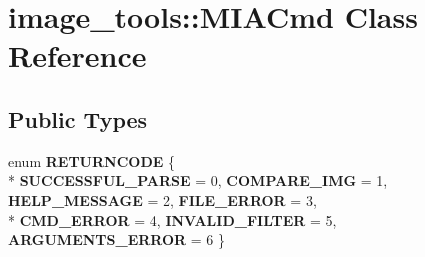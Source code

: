\hypertarget{classimage__tools_1_1MIACmd}{}\section{image\+\_\+tools\+:\+:M\+I\+A\+Cmd Class Reference}
\label{classimage__tools_1_1MIACmd}
\subsection*{Public Types}
\begin{DoxyCompactItemize}
\item 
enum {\bfseries R\+E\+T\+U\+R\+N\+C\+O\+DE} \{ \\*
{\bfseries S\+U\+C\+C\+E\+S\+S\+F\+U\+L\+\_\+\+P\+A\+R\+SE} = 0, 
{\bfseries C\+O\+M\+P\+A\+R\+E\+\_\+\+I\+MG} = 1, 
{\bfseries H\+E\+L\+P\+\_\+\+M\+E\+S\+S\+A\+GE} = 2, 
{\bfseries F\+I\+L\+E\+\_\+\+E\+R\+R\+OR} = 3, 
\\*
{\bfseries C\+M\+D\+\_\+\+E\+R\+R\+OR} = 4, 
{\bfseries I\+N\+V\+A\+L\+I\+D\+\_\+\+F\+I\+L\+T\+ER} = 5, 
{\bfseries A\+R\+G\+U\+M\+E\+N\+T\+S\+\_\+\+E\+R\+R\+OR} = 6
 \}\hypertarget{classimage__tools_1_1MIACmd_af5f222d1fc757e0cb5454dccfea7a17b}{}\label{classimage__tools_1_1MIACmd_af5f222d1fc757e0cb5454dccfea7a17b}

\end{DoxyCompactItemize}
